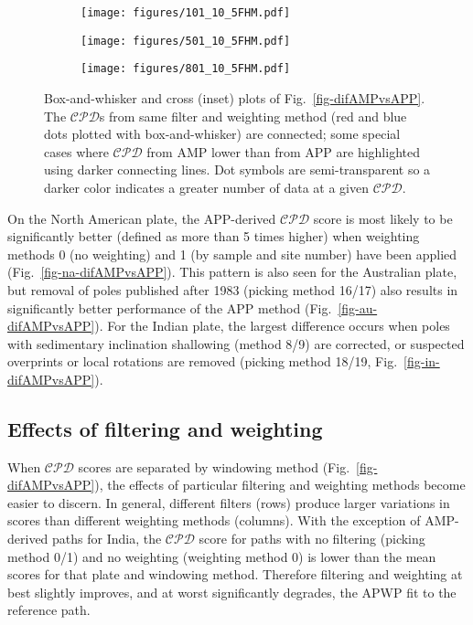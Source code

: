 \begin{figure*}
	\centering
	\begin{subfigure}{.9\textwidth}
		\texttt{[image: figures/101\_10\_5FHM.pdf]}
		\caption{}\label{fig-na-boxAMPvsAPP}
	\end{subfigure}
	\vspace{.1em}
	\begin{subfigure}{.9\textwidth}
		\texttt{[image: figures/501\_10\_5FHM.pdf]}
		\caption{}\label{fig-in-boxAMPvsAPP}
	\end{subfigure}
	\vspace{.1em}
	\begin{subfigure}{.9\textwidth}
		\texttt{[image: figures/801\_10\_5FHM.pdf]}
		\caption{}\label{fig-au-boxAMPvsAPP}
	\end{subfigure}
	\caption[]{Box-and-whisker and cross (inset) plots of
Fig.~\ref{fig-difAMPvsAPP}. The $\mathcal{CPD}$s from same filter and weighting
method (red and blue dots plotted with box-and-whisker) are connected; some
special cases where $\mathcal{CPD}$ from AMP lower than from APP are highlighted
using darker connecting lines. Dot symbols are semi-transparent so a darker
color indicates a greater number of data at a given
$\mathcal{CPD}$.}\label{fig-boxAMPvsAPP}
\end{figure*}

On the North American plate, the APP-derived $\mathcal{CPD}$ score is most
likely to be significantly better (defined as more than 5 times higher) when
weighting methods 0 (no weighting) and 1 (by sample and site number) have been
applied (Fig.~\ref{fig-na-difAMPvsAPP}). This pattern is also seen for the
Australian plate, but removal of poles published after 1983 (picking method
16/17) also results in significantly better performance of the APP method
(Fig.~\ref{fig-au-difAMPvsAPP}). For the Indian plate, the largest difference
occurs when poles with sedimentary inclination shallowing (method 8/9) are
corrected, or suspected overprints or local rotations are removed (picking
method 18/19, Fig.~\ref{fig-in-difAMPvsAPP}).

\subsection{Effects of filtering and weighting}

When $\mathcal{CPD}$ scores are separated by windowing method
(Fig.~\ref{fig-difAMPvsAPP}), the effects of particular filtering and weighting
methods become easier to discern. In general, different filters (rows) produce
larger variations in scores than different weighting methods (columns). With
the exception of AMP-derived paths for India, the $\mathcal{CPD}$ score for
paths with no filtering (picking method 0/1) and no weighting (weighting method
0) is lower than the mean scores for that plate and windowing method. Therefore
filtering and weighting at best slightly improves, and at worst significantly
degrades, the APWP fit to the reference path.

